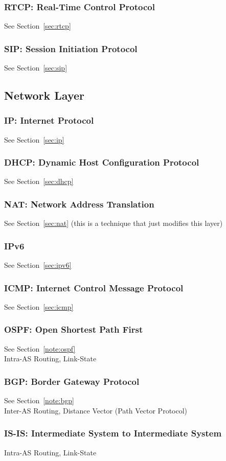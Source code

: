 \subsubsection{RTCP: Real-Time Control Protocol}
See Section~\ref{sec:rtcp}
\subsubsection{SIP: Session Initiation Protocol}
See Section~\ref{sec:sip}

\subsection{Network Layer}
\subsubsection{IP: Internet Protocol}
See Section~\ref{sec:ip}
\subsubsection{DHCP: Dynamic Host Configuration Protocol}
See Section~\ref{sec:dhcp}
\subsubsection{NAT: Network Address Translation}
See Section~\ref{sec:nat} (this is a technique that just modifies this layer)
\subsubsection{IPv6}
See Section~\ref{sec:ipv6}
\subsubsection{ICMP: Internet Control Message Protocol}
See Section~\ref{sec:icmp}
\subsubsection{OSPF: Open Shortest Path First}
See Section~\ref{note:ospf}\\
Intra-AS Routing, Link-State
\subsubsection{BGP: Border Gateway Protocol}
See Section~\ref{note:bgp}\\
Inter-AS Routing, Distance Vector (Path Vector Protocol)
\subsubsection{IS-IS: Intermediate System to Intermediate System}
Intra-AS Routing, Link-State
